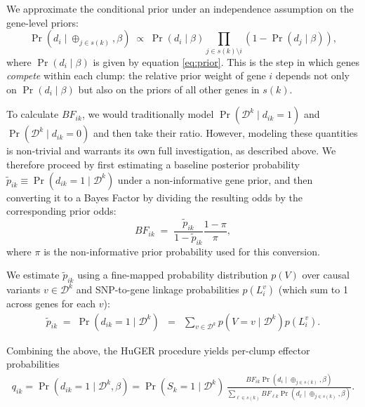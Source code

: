 \documentclass[11pt]{article}
\begin{document}
We approximate the conditional prior under an independence assumption on the
gene-level priors:
\[
\Pr\left(d_i \mid \oplus_{j\in s(k)},\beta\right)
\;\propto\;
\Pr(d_i \mid \beta)\prod_{j\in s(k)\setminus i}\left(1-\Pr(d_j \mid \beta)\right),
\]
where $\Pr(d_i \mid \beta)$ is given by equation \eqref{eq:prior}. This is the
step in which genes \emph{compete} within each clump: the relative prior weight
of gene $i$ depends not only on $\Pr(d_i\mid\beta)$ but also on the priors of
all other genes in $s(k)$.

To calculate $BF_{ik}$, we would traditionally model
$\Pr(\mathcal{D}^k \mid d_{ik}=1)$ and $\Pr(\mathcal{D}^k \mid d_{ik}=0)$ and
then take their ratio. However, modeling these quantities is non-trivial and
warrants its own full investigation, as described above. We therefore proceed
by first estimating a baseline posterior probability
$\tilde{p}_{ik} \equiv \Pr(d_{ik}=1 \mid \mathcal{D}^k)$ under a non-informative
gene prior, and then converting it to a Bayes Factor by dividing the resulting
odds by the corresponding prior odds:
\[
BF_{ik} \;=\; \frac{\tilde{p}_{ik}}{1-\tilde{p}_{ik}} \frac{1-\pi}{\pi},
\]
where $\pi$ is the non-informative prior probability used for this conversion.

We estimate $\tilde{p}_{ik}$ using a fine-mapped probability distribution
$p(V)$ over causal variants $v\in\mathcal{D}^k$ and SNP-to-gene linkage
probabilities $p(L_i^v)$ (which sum to 1 across genes for each $v$):
\begin{eqnarray*}
\tilde{p}_{ik}
\;=\;
\Pr(d_{ik}=1 \mid \mathcal{D}^k)
&=&
\sum_{v \in \mathcal{D}^k} p(V=v \mid \mathcal{D}^k) p(L_i^v).
\end{eqnarray*}

Combining the above, the HuGER procedure yields per-clump effector probabilities
\begin{multline}
q_{ik}
=
\Pr(d_{ik}=1 \mid \mathcal{D}^k,\beta)
=
\Pr(S_k=1 \mid \mathcal{D}^k)\,
\frac{BF_{ik}\Pr\left(d_i \mid \oplus_{j\in s(k)},\beta\right)}
{\sum_{\ell\in s(k)} BF_{\ell k}\Pr\left(d_\ell \mid \oplus_{j\in s(k)},\beta\right)}.
\label{huge}
\end{multline}
\end{document}
